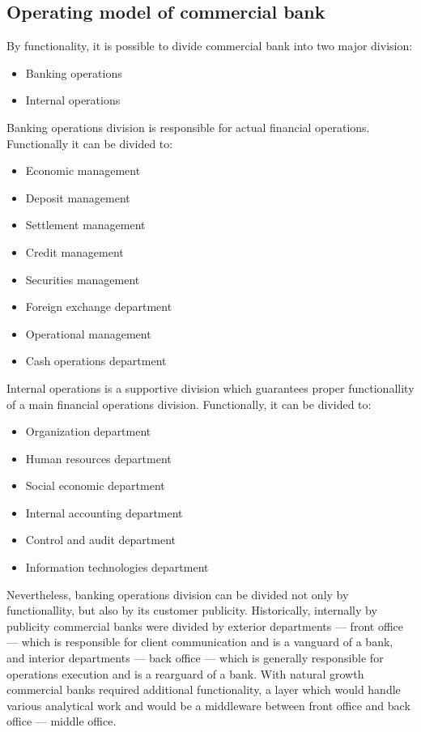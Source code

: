\subsection{Operating model of commercial bank}

By functionality, it is possible to divide commercial bank into two major division:
\begin{itemize}
    \item Banking operations
    \item Internal operations
\end{itemize}

Banking operations division is responsible for actual financial operations. Functionally it can be divided to:
\begin{itemize}
    \item Economic management
    \item Deposit management
    \item Settlement management
    \item Credit management
    \item Securities management
    \item Foreign exchange department
    \item Operational management
    \item Cash operations department
\end{itemize}

Internal operations is a supportive division which guarantees proper functionallity of a main financial operations division.
Functionally, it can be divided to:
\begin{itemize}
    \item Organization department
    \item Human resources department
    \item Social economic department
    \item Internal accounting department
    \item Control and audit department
    \item Information technologies department
\end{itemize}

Nevertheless, banking operations division can be divided not only by functionallity, but also by its customer publicity.
Historically, internally by publicity commercial banks were divided by exterior departments — front office — which is responsible for client communication and is a vanguard of a bank, and interior departments — back office — which is generally responsible for operations execution and is a rearguard of a bank.
With natural growth commercial banks required additional functionality, a layer which would handle various analytical work and would be a middleware between front office and back office — middle office.

